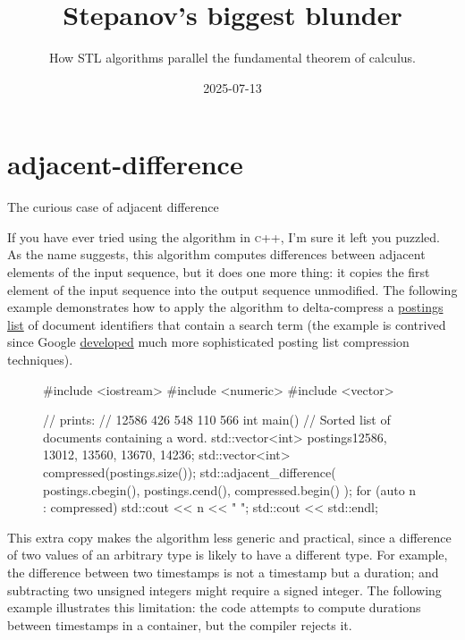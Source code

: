 \documentclass{article}
\title{Stepanov's biggest blunder}
\subtitle{How STL algorithms parallel the fundamental theorem of calculus.}
\date{2025-07-13}
\begin{document}
\section{adjacent-difference}{The curious case of adjacent difference}

If you have ever tried using the \href{http://www.en.cppreference.com/w/cpp/algorithm/adjacent_difference.html}{} algorithm in \textsc{c++},
I'm sure it left you puzzled.
As the name suggests, this algorithm computes differences between adjacent elements of the input sequence,
but it does one more thing: it copies the first element of the input sequence into the output sequence unmodified.
The following example demonstrates how to apply the algorithm to delta-compress a \href{https://en.wikipedia.org/wiki/Inverted_index}{postings list} of document identifiers that contain a search term
(the example is contrived since Google \href{https://static.googleusercontent.com/media/research.google.com/en//people/jeff/WSDM09-keynote.pdf}{developed} much more sophisticated posting list compression techniques).

\begin{figure}
\begin{code}
#include <iostream>
#include <numeric>
#include <vector>

// prints:
// 12586 426 548 110 566
int main() {
    // Sorted list of documents containing a word.
    std::vector<int> postings{{12586, 13012, 13560, 13670, 14236}};
    std::vector<int> compressed(postings.size());
    std::adjacent_difference(
        postings.cbegin(),
        postings.cend(),
        compressed.begin()
    );
    for (auto n : compressed) std::cout << n << " ";
    std::cout << std::endl;
}
\end{code}
\end{figure}

This extra copy makes the algorithm less generic and practical,
since a difference of two values of an arbitrary type  is likely to have a different type.
For example, the difference between two timestamps is not a timestamp but a duration;
and subtracting two unsigned integers might require a signed integer.
The following example illustrates this limitation: the code attempts to compute durations between timestamps in a container, but the compiler rejects it.
\end{document}

